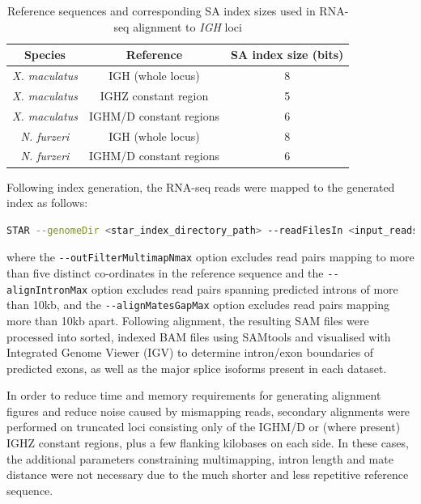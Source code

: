 \begin{table}
\caption{Reference sequences and corresponding SA index sizes used in RNA-seq alignment to \textit{IGH} loci}\label{tab:jh-aux-patterns}
\begin{tabular}{ccc}\\\toprule 
Species & Reference & SA index size (bits)\\\midrule
\textit{X. maculatus} & IGH (whole locus) & 8\\
\textit{X. maculatus} & IGHZ constant region & 5\\ 
\textit{X. maculatus} & IGHM/D constant regions & 6\\ 
\textit{N. furzeri} & IGH (whole locus) & 8\\
\textit{N. furzeri} & IGHM/D constant regions & 6\\ 
\end{tabular}
\label{tab:sa_index}
\end{table}

Following index generation, the RNA-seq reads were mapped to the generated index as follows:

\begin{lstlisting}[language=bash]
STAR --genomeDir <star_index_directory_path> --readFilesIn <input_reads> --outFilterMultimapNmax 5 --alignIntronMax 10000 --alignMatesGapMax 10000
\end{lstlisting}

where the \lstinline{--outFilterMultimapNmax} option excludes read pairs mapping to more than five distinct co-ordinates in the reference sequence and the \lstinline{--alignIntronMax} option excludes read pairs spanning predicted introns of more than 10kb, and the \lstinline{--alignMatesGapMax} option excludes read pairs mapping more than 10kb apart. Following alignment, the resulting SAM files were processed into sorted, indexed BAM files using SAMtools and visualised with Integrated Genome Viewer (IGV) to determine intron/exon boundaries of predicted exons, as well as the major splice isoforms present in each dataset.

In order to reduce time and memory requirements for generating alignment figures and reduce noise caused by mismapping reads, secondary alignments were performed on truncated loci consisting only of the IGHM/D or (where present) IGHZ constant regions, plus a few flanking kilobases on each side. In these cases, the additional parameters constraining multimapping, intron length and mate distance were not necessary due to the much shorter and less repetitive reference sequence.

